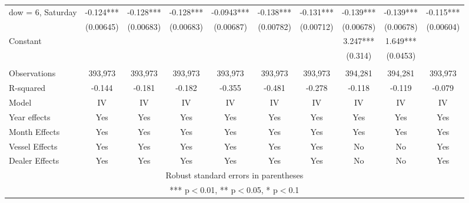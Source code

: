 \begin{tabular}{lccccccccc}
dow = 6, Saturday & -0.124*** & -0.128*** & -0.128*** & -0.0943*** & -0.138*** & -0.131*** & -0.139*** & -0.139*** & -0.115*** \\
 & (0.00645) & (0.00683) & (0.00683) & (0.00687) & (0.00782) & (0.00712) & (0.00678) & (0.00678) & (0.00604) \\
Constant &  &  &  &  &  &  & 3.247*** & 1.649*** &  \\
 &  &  &  &  &  &  & (0.314) & (0.0453) &  \\
 &  &  &  &  &  &  &  &  &  \\
Observations & 393,973 & 393,973 & 393,973 & 393,973 & 393,973 & 393,973 & 394,281 & 394,281 & 393,973 \\
R-squared & -0.144 & -0.181 & -0.182 & -0.355 & -0.481 & -0.278 & -0.118 & -0.119 & -0.079 \\
Model & IV & IV & IV & IV & IV & IV & IV & IV & IV \\
Year effects & Yes & Yes & Yes & Yes & Yes & Yes & Yes & Yes & Yes \\
Month Effects & Yes & Yes & Yes & Yes & Yes & Yes & Yes & Yes & Yes \\
Vessel Effects & Yes & Yes & Yes & Yes & Yes & Yes & No & No & Yes \\
 Dealer Effects & Yes & Yes & Yes & Yes & Yes & Yes & No & No & Yes \\ \hline
\multicolumn{10}{c}{ Robust standard errors in parentheses} \\
\multicolumn{10}{c}{ *** p$<$0.01, ** p$<$0.05, * p$<$0.1} \\
\end{tabular}

